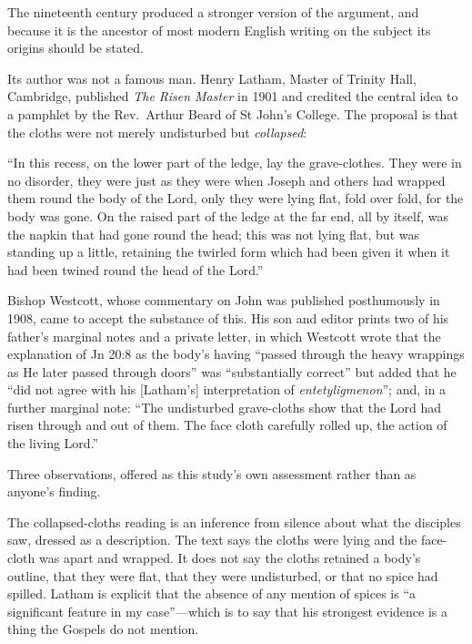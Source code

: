 The nineteenth century produced a stronger version of the argument, and because
it is the ancestor of most modern English writing on the subject its origins
should be stated.

Its author was not a famous man. Henry Latham, Master of Trinity Hall,
Cambridge, published \emph{The Risen Master} in 1901 and credited the central
idea to a pamphlet by the Rev.\ Arthur Beard of St John's College. The
proposal is that the cloths were not merely undisturbed but \emph{collapsed}:

\begin{studyframe}\small
``In this recess, on the lower part of the ledge, lay the grave-clothes. They
were in no disorder, they were just as they were when Joseph and others had
wrapped them round the body of the Lord, only they were lying flat, fold over
fold, for the body was gone. On the raised part of the ledge at the far end,
all by itself, was the napkin that had gone round the head; this was not lying
flat, but was standing up a little, retaining the twirled form which had been
given it when it had been twined round the head of the
Lord.''
\end{studyframe}

Bishop Westcott, whose commentary on John was published posthumously in 1908,
came to accept the substance of this. His son and editor prints two of his
father's marginal notes and a private letter, in which Westcott wrote that the
explanation of Jn 20:8 as the body's having ``passed through the heavy
wrappings as He later passed through doors'' was ``substantially correct'' but
added that he ``did not agree with his [Latham's] interpretation of
\emph{entetyligmenon}''; and, in a further marginal note: ``The undisturbed
grave-cloths show that the Lord had risen through and out of them. The face
cloth carefully rolled up, the action of the living
Lord.''

Three observations, offered as this study's own assessment rather than as
anyone's finding.

The collapsed-cloths reading is an inference from silence about what the
disciples saw, dressed as a description. The text says the cloths were lying
and the face-cloth was apart and wrapped. It does not say the cloths retained a
body's outline, that they were flat, that they were undisturbed, or that no
spice had spilled. Latham is explicit that the absence of any mention of spices
is ``a significant feature in my case''---which is to say that his strongest
evidence is a thing the Gospels do not mention.

